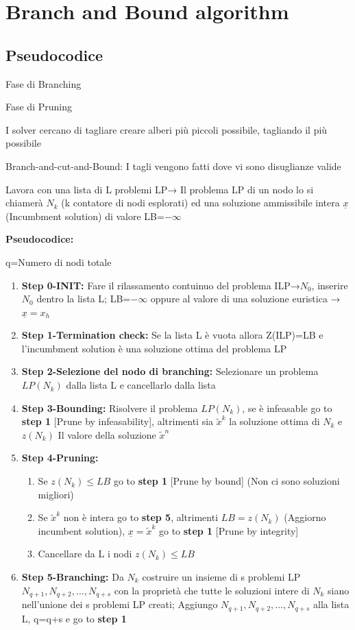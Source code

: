 \chapter{Branch and Bound algorithm}
\section{Pseudocodice}
Fase di Branching

Fase di Pruning

I solver cercano di tagliare creare alberi più piccoli possibile, tagliando il più possibile

Branch-and-cut-and-Bound: I tagli vengono fatti dove vi sono disuglianze valide

Lavora con una lista di L problemi LP→ Il problema LP di un nodo lo si chiamerà $N_k$ (k contatore di nodi esplorati) ed una soluzione ammissibile intera $\underline{x}$ (Incumbment solution) di valore LB=$-\infty$

\noindent \textbf{Pseudocodice:}

q=Numero di nodi totale

\begin{enumerate}
    \item \textbf{Step 0-INIT:} Fare il rilassamento contuinuo del problema ILP→$N_0$, inserire $N_0$ dentro la lista L; LB=$-\infty$ oppure al valore di una soluzione euristica → $\underline{x}=x_h$
    \item \textbf{Step 1-Termination check:} Se la lista L è vuota allora Z(ILP)=LB e l’incumbment solution è una soluzione ottima del problema LP
    \item \textbf{Step 2-Selezione del nodo di branching:} Selezionare un problema $LP(N_k)$ dalla lista L e cancellarlo dalla lista
    \item \textbf{Step 3-Bounding:} Risolvere il problema $LP(N_k)$, se è infeasable go to \textbf{step 1} [Prune by infeasability], altrimenti sia $\tilde{x}^k$ la soluzione ottima di $N_k$ e $z(N_k)$ Il valore della soluzione $\tilde{x}^n$
    \item \textbf{Step 4-Pruning:} 
    \begin{enumerate}
        \item Se $z(N_k) \leqslant LB$ go to \textbf{step 1} [Prune by bound]  (Non ci sono soluzioni migliori)
        \item Se $\tilde{x}^k$ non è intera go to \textbf{step 5}, altrimenti $LB=z(N_k)$ (Aggiorno incumbent solution), $\underline{x}=\tilde{x}^k$ go to \textbf{step 1} [Prune by integrity]
        \item Cancellare da L i nodi $z(N_k) \leqslant LB$
    \end{enumerate}
    \item \textbf{Step 5-Branching:} Da $N_k$ costruire un insieme di s problemi LP $N_{q+1}, N_{q+2}, …, N_{q+s}$ con la proprietà che tutte le soluzioni intere di $N_k$ siano nell’unione dei s problemi LP creati; Aggiungo $N_{q+1}, N_{q+2}, …, N_{q+s}$ alla lista L, q=q+s e go to \textbf{step 1}
\end{enumerate}

